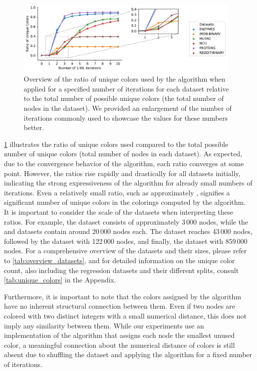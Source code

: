\begin{figure}[htb]
	\centering
	\includegraphics[width=0.975\textwidth]{Figures/wl_unique_colors.pdf}
	\caption{Overview of the ratio of unique colors used by the \wl algorithm when applied for a specified number of iterations for each dataset relative to the total number of possible unique colors (the total number of nodes in the dataset). We provided an enlargement of the number of \wl iterations commonly used to showcase the values for these numbers better.}
	\label{fig:wl_unique_colors}
\end{figure}

\cref{fig:wl_unique_colors} illustrates the ratio of unique colors used compared to the total possible number of unique colors (total number of nodes in each dataset). As expected, due to the convergence behavior of the \wl algorithm, each ratio converges at some point. However, the ratios rise rapidly and drastically for all datasets initially, indicating the strong expressiveness of the algorithm for already small numbers of iterations. Even a relatively small ratio, such as approximately , signifies a significant number of unique colors in the colorings computed by the \wl algorithm. It is important to consider the scale of the datasets when interpreting these ratios. For example, the \mutag dataset consists of approximately 3\,000 nodes, while the \enzymes and \imdb datasets contain around 20\,000 nodes each. The \proteins dataset reaches 43\,000 nodes, followed by the \nci dataset with 122\,000 nodes, and finally, the \reddit dataset with 859\,000 nodes. For a comprehensive overview of the datasets and their sizes, please refer to \cref{tab:overview_datasets}, and for detailed information on the unique color count, also including the regression datasets and their different splits, consult \cref{tab:unique_colors} in the Appendix.

Furthermore, it is important to note that the colors assigned by the \wl algorithm have no inherent structural connection between them. Even if two nodes are colored with two distinct integers with a small numerical distance, this does not imply any similarity between them. While our experiments use an implementation of the \wl algorithm that assigns each node the smallest unused color, a meaningful connection about the numerical distance of colors is still absent due to shuffling the dataset and applying the \wl algorithm for a fixed number of iterations.

